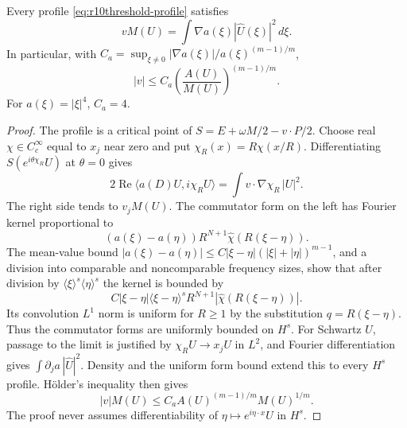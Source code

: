 \begin{lemma}
\label{lem:r10threshold-velocity}
Every profile \eqref{eq:r10threshold-profile} satisfies
\begin{equation}\label{eq:r10threshold-velocity}
 vM(U)=\int\nabla a(\xi)|\widehat U(\xi)|^2\,d\xi.
\end{equation}
In particular, with
$C_a=\sup_{\xi\ne0}|\nabla a(\xi)|/a(\xi)^{(m-1)/m}$,
\begin{equation}\label{eq:r10threshold-vbound}
 |v|\le C_a\left(\frac{A(U)}{M(U)}\right)^{(m-1)/m}.
\end{equation}
For $a(\xi)=|\xi|^4$, $C_a=4$.
\end{lemma}
\begin{proof}
The profile is a critical point of
$S=E+\omega M/2-v\cdot P/2$. Choose real
$\chi\in C_c^\infty$ equal to $x_j$ near zero and put
$\chi_R(x)=R\chi(x/R)$. Differentiating
$S(e^{i\theta\chi_R}U)$ at $\theta=0$ gives
\[
 2\operatorname{Re}\langle a(D)U,i\chi_RU\rangle
 =\int v\cdot\nabla\chi_R\,|U|^2.
\]
The right side tends to $v_jM(U)$. The commutator form on the left
has Fourier kernel proportional to
\[
 (a(\xi)-a(\eta))R^{N+1}\widehat\chi(R(\xi-\eta)).
\]
The mean-value bound
$|a(\xi)-a(\eta)|\le C|\xi-\eta|(|\xi|+|\eta|)^{m-1}$,
and a division into comparable and noncomparable frequency sizes,
show that after division by
$\langle\xi\rangle^s\langle\eta\rangle^s$ the kernel is bounded by
\[
 C|\xi-\eta|\langle\xi-\eta\rangle^s
 R^{N+1}|\widehat\chi(R(\xi-\eta))|.
\]
Its convolution $L^1$ norm is uniform for $R\ge1$ by the substitution
$q=R(\xi-\eta)$. Thus the commutator forms are uniformly bounded on
$H^s$. For Schwartz $U$, passage to the limit is justified by
$\chi_RU\to x_jU$ in $L^2$, and Fourier differentiation gives
$\int\partial_ja\,|\widehat U|^2$. Density and the uniform form bound
extend this to every $H^s$ profile. H\"older's inequality then gives
\[
 |v|M(U)\le C_a A(U)^{(m-1)/m}M(U)^{1/m}.
\]
The proof never assumes differentiability of
$\eta\mapsto e^{i\eta\cdot x}U$ in $H^s$.
\end{proof}

